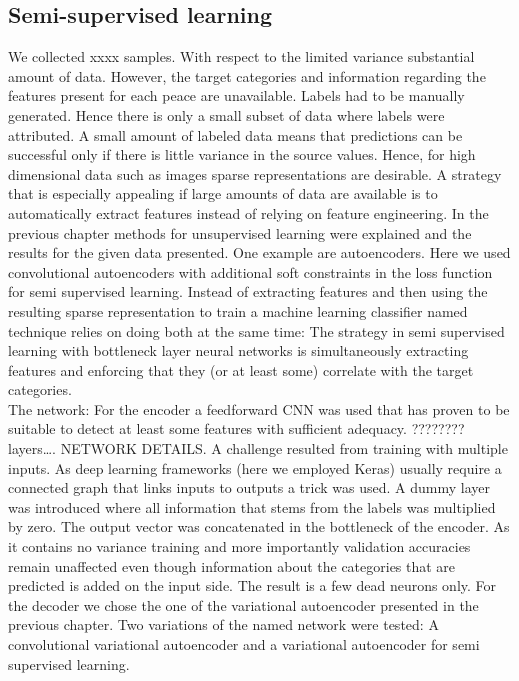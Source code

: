 \subsection{Semi-supervised learning}

We collected xxxx samples. With respect to the limited variance substantial amount of data. However, the target categories and information regarding the features present for each peace are unavailable. Labels had to be manually generated. Hence there is only a small subset of data where labels were attributed. A small amount of labeled data means that predictions can be successful only if there is little variance in the source values. Hence, for high dimensional data such as images sparse representations are desirable. A strategy that is especially appealing if large amounts of data are available is to automatically extract features instead of relying on feature engineering.
In the previous chapter methods for unsupervised learning were explained and the results for the given data presented. One example are autoencoders. Here we used convolutional autoencoders with additional soft constraints in the loss function for semi supervised learning. Instead of extracting features and then using the resulting sparse representation to train a machine learning classifier named technique relies on doing both at the same time: The strategy in semi supervised learning with bottleneck layer neural networks is simultaneously extracting features and enforcing that they (or at least some) correlate with the target categories. \\
The network: For the encoder a feedforward CNN was used that has proven to be suitable to detect at least some features with sufficient adequacy. ???????? layers…. NETWORK DETAILS. A challenge resulted from training with multiple inputs. As deep learning frameworks (here we employed Keras) usually require a connected graph that links inputs to outputs a trick was used. A dummy layer was introduced where all information that stems from the labels was multiplied by zero. The output vector was concatenated in the bottleneck of the encoder. As it contains no variance training and more importantly validation accuracies remain unaffected even though information about the categories that are predicted is added on the input side. The result is a few dead neurons only. For the decoder we chose the one of the variational autoencoder presented in the previous chapter. Two variations of the named network were tested: A convolutional variational autoencoder and a variational autoencoder for semi supervised learning.\\
